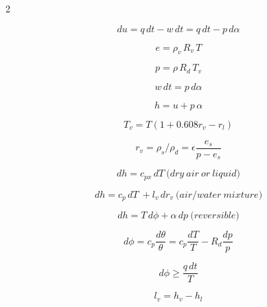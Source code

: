 \documentclass[12pt]{article}
\begin{document}
\begin{multicols}{2}

  \begin{equation}
\label{eq:first}
du = q\,dt - w\,dt = q\,dt - p\,d\alpha
  \end{equation}

\begin{equation}
e = \rho_v\, R_v\, T
\end{equation}

\begin{equation}
p = \rho\, R_d\, T_v
\end{equation}


\begin{equation}
w \,dt = p\,d\alpha
\end{equation}

\begin{equation}
h = u + p \,\alpha
\end{equation}

\begin{equation}
  \label{eq:tv}
  T_v = T(1 + 0.608 r_v - r_l)
\end{equation}

\begin{equation}
  \label{eq:wv}
  r_v = \rho_s/\rho_d = \epsilon \frac{e_s}{p - e_s}
\end{equation}

\begin{equation}
dh = c_{px}\, dT\ \mathrm(dry\ air\ or\ liquid)
\end{equation}

\begin{equation}
dh = c_p\, dT\ + l_v\,dr_v\ \mathrm(air/water\ mixture)
\end{equation}


\begin{equation}
\label{eq:firstenthalpy}
dh = T\,d\phi + \alpha\,dp\ \mathrm(reversible)
\end{equation}

\begin{equation}
d\phi = c_p \frac{d\theta}{\theta} = c_p \frac{dT}{T} - R_d \frac{dp}{p}
\end{equation}

\begin{equation}
  \label{eq:ds}
  d\phi \geq \frac{q\,dt}{T}
\end{equation}

\begin{equation}
l_v = h_v - h_l
\end{equation}



\end{multicols}
\end{document}
